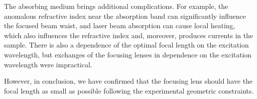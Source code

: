 The absorbing medium brings additional complications.
For example, the anomalous refractive index near the absorption band can
significantly influence the focused beam waist, and laser beam absorption can
cause local heating, which also influences the refractive index and, moreover,
produces currents in the sample.
There is also a dependence of the optimal focal length on the excitation
wavelength, but exchanges of the focusing lenses in dependence on the
excitation wavelength were impractical.

However, in conclusion, we have confirmed that the focusing lens should have
the focal length as small as possible following the experimental geometric
constraints.
